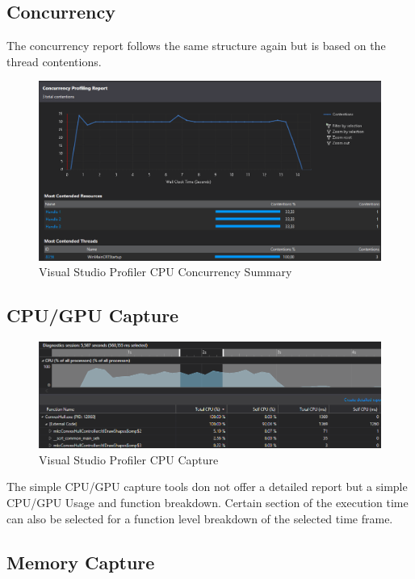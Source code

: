 \subsection{Concurrency}

The concurrency report follows the same structure again but is based on the thread contentions.

\begin{figure}[htbp]
\includegraphics[scale = 0.275]{img/VisConcurrency.PNG}
\caption{Visual Studio Profiler CPU Concurrency Summary}
\label{fig:VisualStudioProfilerConcurrencySummary}
\end{figure}

\subsection{CPU/GPU Capture}

\begin{figure}[htbp]
\includegraphics[scale = 0.30]{img/VisCPU.PNG}
\caption{Visual Studio Profiler CPU Capture}
\label{fig:VisualStudioProfilerCPUCapture}
\end{figure}

The simple CPU/GPU capture tools don not offer a detailed report but a simple CPU/GPU Usage and function breakdown.
Certain section of the execution time can also be selected for a function level breakdown of the selected time frame.

\subsection{Memory Capture}

